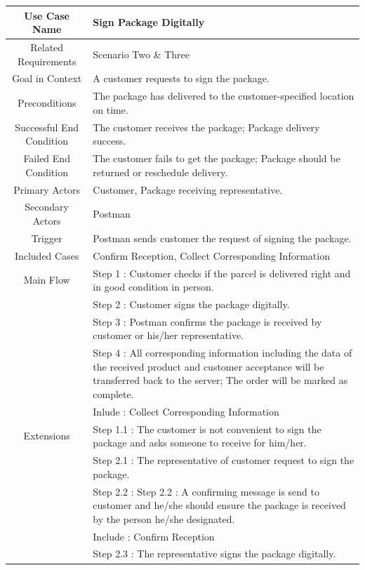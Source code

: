 \documentclass[12pt]{scrreprt}
\begin{document}
\begin{table}
  \centering
  \begin{tabular}{| c | p{11cm} |}
    \hline
    Use Case Name & Sign Package Digitally\\
    \hline
    Related Requirements & Scenario Two \& Three\\
    \hline
    Goal in Context & A customer requests to sign the package.\\
    \hline
    Preconditions & The package has delivered to the customer-specified
    location on time.\\
    \hline
    Successful End Condition & The customer receives the package; Package
    delivery success.\\
    \hline
    Failed End Condition & The customer fails to get the package; Package
    should be returned or reschedule delivery.\\
    \hline
    Primary Actors & Customer, Package receiving representative.\\
    \hline
    Secondary Actors & Postman\\
    \hline
    Trigger & Postman sends customer the request of signing the package.\\
    \hline
    Included Cases & Confirm Reception, Collect Corresponding Information\\
    \hline
    Main Flow & Step 1 : Customer checks if the parcel is delivered right and
    in good condition in person.\\
    & Step 2 : Customer signs the package digitally.\\
    & Step 3 : Postman confirms the package is received by customer or his/her
    representative.\\
    & Step 4 : All corresponding information including the data of the received
    product and customer acceptance will be transferred back to the server;
    The order will be marked as complete.\\
    & Inlude : Collect Corresponding Information\\
    \hline
    Extensions & Step 1.1 : The customer is not convenient to sign the package
    and asks someone to receive for him/her.\\
    & Step 2.1 : The representative of customer request to sign the package.\\
    & Step 2.2 : Step 2.2 : A confirming message is send to customer and he/she
    should ensure the package is received by the person he/she designated.\\
    & Include : Confirm Reception\\
    & Step 2.3 : The representative signs the package digitally.\\
    \hline
  \end{tabular}
\end{table}
\end{document}
